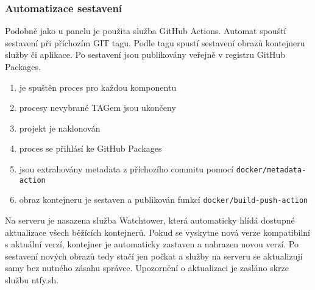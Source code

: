 \subsubsection{Automatizace sestavení}
Podobně jako u panelu je použita služba GitHub Actions. Automat spouští sestavení při příchozím GIT tagu. Podle tagu spustí sestavení obrazů kontejneru služby či aplikace. Po sestavení jsou publikovány veřejně v registru GitHub Packages.

\begin{enumerate}
    \item je spuštěn proces pro každou komponentu
    \item procesy nevybrané TAGem jsou ukončeny
    \item projekt je naklonován
    \item proces se přihlásí ke GitHub Packages
    \item jsou extrahovány metadata z příchozího commitu pomocí \lstinline|docker/metadata-action|
    \item obraz kontejneru je sestaven a publikován funkcí \lstinline|docker/build-push-action|
\end{enumerate}

Na serveru je nasazena služba Watchtower\cite{ContainrrrWatchtower2024}, která automaticky hlídá dostupné aktualizace všech běžících kontejnerů. Pokud se vyskytne nová verze kompatibilní s aktuální verzí, kontejner je automaticky zastaven a nahrazen novou verzí. Po sestavení nových obrazů tedy stačí jen počkat a služby na serveru se aktualizují samy bez nutného zásahu správce. Upozornění o aktualizaci je zasláno skrze službu ntfy.sh\cite{NtfyShPush}.
